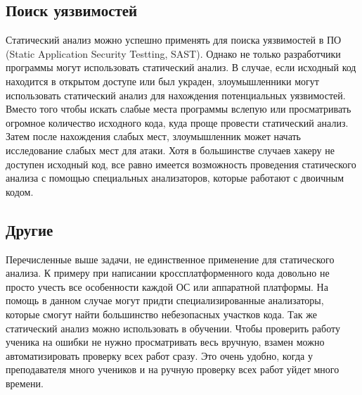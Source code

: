 \subsection {Поиск уязвимостей}
Статический анализ можно успешно применять для поиска уязвимостей в ПО (Static Application Security Testting, SAST).
Однако не только разработчики программы могут использовать статический анализ. В случае, если
исходный код находится в открытом доступе или был украден, злоумышленники могут использовать 
статический анализ для нахождения потенциальных уязвимостей. Вместо того чтобы искать слабые
места программы вслепую или просматривать огромное количество исходного кода, куда проще провести статический анализ.
Затем после нахождения слабых мест, злоумышленник может начать исследование слабых мест для атаки.
Хотя в большинстве случаев хакеру не доступен исходный код, все равно имеется возможность проведения 
статического анализа с помощью специальных анализаторов, которые работают с двоичным кодом.

\subsection {Другие}
Перечисленные выше задачи, не единственное применение для статического анализа. К примеру 
при написании кроссплатформенного кода довольно не просто учесть все особенности каждой ОС
или аппаратной платформы. На помощь в данном случае могут придти специализированные анализаторы,
которые смогут найти большинство небезопасных участков кода. 
Так же статический анализ можно использовать в обучении. Чтобы проверить работу ученика на ошибки
не нужно просматривать весь вручную, взамен можно автоматизировать проверку всех работ сразу.
Это очень удобно, когда у преподавателя много учеников и на ручную проверку всех работ уйдет
много времени. 

